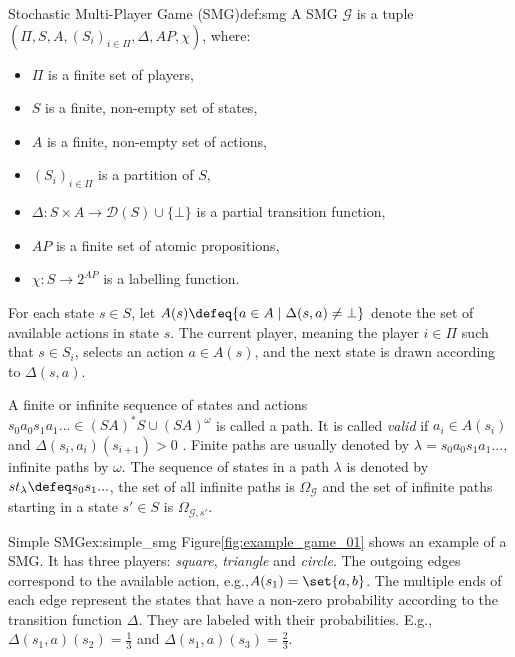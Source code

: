 \begin{mydefinition}{Stochastic Multi-Player Game (SMG)}{def:smg}
A SMG $\mathcal{G}$ is a tuple $(\Pi, S, A, (S_i)_{i\in\Pi}, \Delta, AP, \chi)$, where:
\begin{itemize}
    \item $\Pi$ is a finite set of players,
    \item $S$ is a finite, non-empty set of states,
    \item $A$ is a finite, non-empty set of actions,
    \item $(S_i)_{i\in\Pi}$ is a partition of $S$,
    \item $\Delta: S \times A \to \mathcal{D}(S) \cup \{\bot\}$ is a partial transition function,
    \item $AP$ is a finite set of atomic propositions,
    \item $\chi: S \to 2^{AP}$ is a labelling function.
\end{itemize}
\end{mydefinition}

For each state $s \in S$, let $A(s) \defeq \{a \in A \mid \Delta(s, a) \neq \bot\}$ denote the set of available actions in state $s$. The current player, meaning the player $i \in \Pi$ such that $s \in S_i$, selects an action $a \in A(s)$, and the next state is drawn according to $\Delta(s, a)$.

A finite or infinite sequence of states and actions $s_0a_0s_1a_1...\in (SA)^\ast S\cup(SA)^\omega$ is called a path. It is called \textit{valid} if $a_i\in A(s_i)$ and $\Delta(s_i, a_i)(s_{i+1})>0$ . Finite paths are usually denoted by $\lambda=s_0a_0s_1a_1...$, infinite paths by $\omega$. The sequence of states in a path $\lambda$ is denoted by $st_\lambda\defeq s_0s_1...$, the set of all infinite paths is $\Omega_\mathcal{G}$ and the set of infinite paths starting in a state $s'\in S$ is $\Omega_{\mathcal{G},s'}$.



\begin{myexample}{Simple SMG}{ex:simple_smg}
Figure\~\ref{fig:example_game_01} shows an example of a SMG. It has three players: \textit{square}, \textit{triangle} and \textit{circle}. The outgoing edges correspond to the available action, e.g.,$A(s_1)=\set{a, b}$. The multiple ends of each edge represent the states that have a non-zero probability according to the transition function $\Delta$. They are labeled with their probabilities. E.g.,$\Delta(s_1, a)(s_2)=\frac{1}{3}$ and $\Delta(s_1, a)(s_3)=\frac{2}{3}$.
\end{myexample}

